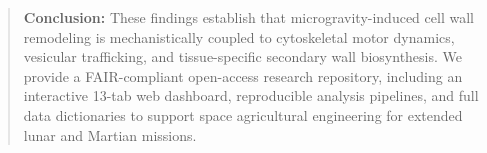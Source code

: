 \begin{abstract}
\textbf{Conclusion:} These findings establish that microgravity-induced cell wall remodeling is mechanistically coupled to cytoskeletal motor dynamics, vesicular trafficking, and tissue-specific secondary wall biosynthesis. We provide a FAIR-compliant open-access research repository, including an interactive 13-tab web dashboard, reproducible analysis pipelines, and full data dictionaries to support space agricultural engineering for extended lunar and Martian missions.
\end{abstract}
